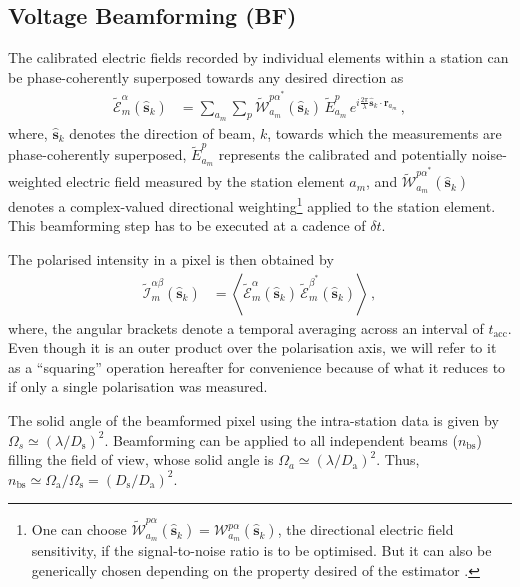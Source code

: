 \documentclass[
  journal=pasa,
  manuscript=article-type,
  year=2020,
  volume=37,
]{cup-journal}
\begin{document}
\subsection{Voltage Beamforming (BF)}

The calibrated electric fields recorded by individual elements within a station can be phase-coherently superposed towards any desired direction as
\begin{align}
    \widetilde{\mathcal{E}}_m^\alpha(\hat{\boldsymbol{s}}_k) &= \sum_{a_m} \sum_p  \widetilde{\mathcal{W}}_{a_m}^{{p\alpha}^*}(\hat{\boldsymbol{s}}_k) \, \widetilde{E}_{a_m}^p \, e^{i\frac{2\pi}{\lambda} \hat{\boldsymbol{s}}_k\cdot\boldsymbol{r}_{a_m}} \, , \label{eqn:intra-station-pol-hol-img-expl}
\end{align}
where, $\hat{\boldsymbol{s}}_k$ denotes the direction of beam, $k$, towards which the measurements are phase-coherently superposed, $\widetilde{E}_{a_m}^{p}$ represents the calibrated and potentially noise-weighted electric field measured by the station element $a_m$, and $\widetilde{\mathcal{W}}_{a_m}^{{p\alpha}^*}(\hat{\boldsymbol{s}}_k)$ denotes a complex-valued directional weighting\footnote{One can choose $\widetilde{\mathcal{W}}_{a_m}^{p\alpha}(\hat{\boldsymbol{s}}_k)=\mathcal{W}_{a_m}^{p\alpha}(\hat{\boldsymbol{s}}_k)$, the directional electric field sensitivity, if the signal-to-noise ratio is to be optimised. But it can also be generically chosen depending on the property desired of the estimator \cite[][]{Morales2011}.} applied to the station element. This beamforming step has to be executed at a cadence of $\delta t$. 

The polarised intensity in a pixel is then obtained by
\begin{align}
    \widetilde{\mathcal{I}}^{\alpha\beta}_m(\hat{\boldsymbol{s}}_k) &= \left\langle \widetilde{\mathcal{E}}_m^\alpha(\hat{\boldsymbol{s}}_k) \,  \widetilde{\mathcal{E}}_m^{\beta^*}(\hat{\boldsymbol{s}}_k) \right\rangle \, , \label{eqn:intra-station-opt-pol-img-outprod}
\end{align}
where, the angular brackets denote a temporal averaging across an interval of $t_\textrm{acc}$. Even though it is an outer product over the polarisation axis, we will refer to it as a ``squaring'' operation hereafter for convenience because of what it reduces to if only a single polarisation was measured. 

The solid angle of the beamformed pixel using the intra-station data is given by $\Omega_s \simeq (\lambda/D_\textrm{s})^2$. Beamforming can be applied to all independent beams ($n_\textrm{bs}$) filling the field of view, whose solid angle is $\Omega_a \simeq (\lambda/D_\textrm{a})^2$. Thus, $n_\textrm{bs} \simeq \Omega_\textrm{a}/\Omega_\textrm{s}=(D_\textrm{s}/D_\textrm{a})^2$. 
\end{document}
